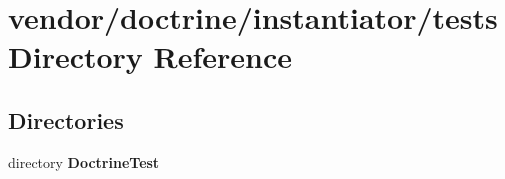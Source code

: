 \section{vendor/doctrine/instantiator/tests Directory Reference}
\label{dir_fb620ff8d2f4f144bf224252236b5a96}
\subsection*{Directories}
\begin{DoxyCompactItemize}
\item 
directory {\bf Doctrine\+Test}
\end{DoxyCompactItemize}
